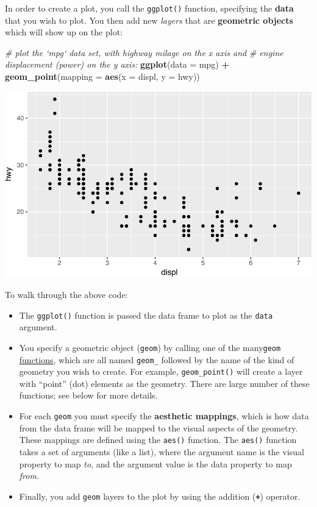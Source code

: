 \documentclass[]{book}
\newenvironment{Shaded}{\begin{snugshade}}{\end{snugshade}}
\newcommand{\KeywordTok}[1]{\textcolor[rgb]{0.13,0.29,0.53}{\textbf{#1}}}
\newcommand{\DataTypeTok}[1]{\textcolor[rgb]{0.13,0.29,0.53}{#1}}
\newcommand{\StringTok}[1]{\textcolor[rgb]{0.31,0.60,0.02}{#1}}
\newcommand{\CommentTok}[1]{\textcolor[rgb]{0.56,0.35,0.01}{\textit{#1}}}
\newcommand{\OperatorTok}[1]{\textcolor[rgb]{0.81,0.36,0.00}{\textbf{#1}}}
\newcommand{\NormalTok}[1]{#1}
\theoremstyle{definition}
\theoremstyle{definition}
\theoremstyle{remark}
\begin{document}
In order to create a plot, you call the \texttt{ggplot()} function,
specifying the \textbf{data} that you wish to plot. You then add new
\emph{layers} that are \textbf{geometric objects} which will show up on
the plot:

\begin{Shaded}
\begin{Highlighting}[]
\CommentTok{# plot the `mpg` data set, with highway milage on the x axis and}
\CommentTok{# engine displacement (power) on the y axis:}
\KeywordTok{ggplot}\NormalTok{(}\DataTypeTok{data =}\NormalTok{ mpg) }\OperatorTok{+}
\StringTok{  }\KeywordTok{geom_point}\NormalTok{(}\DataTypeTok{mapping =} \KeywordTok{aes}\NormalTok{(}\DataTypeTok{x =}\NormalTok{ displ, }\DataTypeTok{y =}\NormalTok{ hwy))}
\end{Highlighting}
\end{Shaded}

\includegraphics{img/ggplot2/basic_mpg-1.pdf}

To walk through the above code:

\begin{itemize}
\item
  The \texttt{ggplot()} function is passed the data frame to plot as the
  \texttt{data} argument.
\item
  You specify a geometric object (\texttt{geom}) by calling one of the
  many\texttt{geom}
  \href{http://ggplot2.tidyverse.org/reference/index.html\#section-layer-geoms}{functions},
  which are all named \texttt{geom\_} followed by the name of the kind
  of geometry you wish to create. For example, \texttt{geom\_point()}
  will create a layer with ``point'' (dot) elements as the geometry.
  There are large number of these functions; see below for more details.
\item
  For each \texttt{geom} you must specify the \textbf{aesthetic
  mappings}, which is how data from the data frame will be mapped to the
  visual aspects of the geometry. These mappings are defined using the
  \texttt{aes()} function. The \texttt{aes()} function takes a set of
  arguments (like a list), where the argument name is the visual
  property to map \emph{to}, and the argument value is the data property
  to map \emph{from}.
\item
  Finally, you add \texttt{geom} layers to the plot by using the
  addition (\textbf{\texttt{+}}) operator.
\end{itemize}
\end{document}
